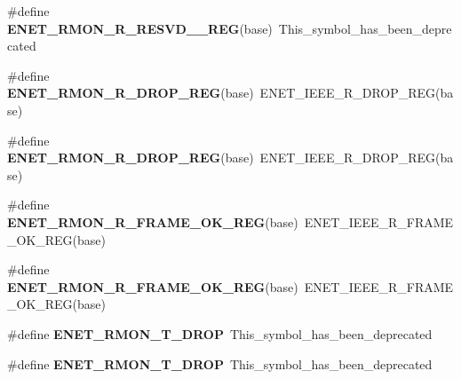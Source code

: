 \begin{DoxyCompactItemize}
\item 
\#define {\bfseries E\+N\+E\+T\+\_\+\+R\+M\+O\+N\+\_\+\+R\+\_\+\+R\+E\+S\+V\+D\+\_\+\_\+\+R\+EG}(base)~This\+\_\+symbol\+\_\+has\+\_\+been\+\_\+deprecated\hypertarget{group__Backward__Compatibility__Symbols_ga911420e8f14b5d4711e0cec193358811}{}\label{group__Backward__Compatibility__Symbols_ga911420e8f14b5d4711e0cec193358811}

\item 
\#define {\bfseries E\+N\+E\+T\+\_\+\+R\+M\+O\+N\+\_\+\+R\+\_\+\+D\+R\+O\+P\+\_\+\+R\+EG}(base)~E\+N\+E\+T\+\_\+\+I\+E\+E\+E\+\_\+\+R\+\_\+\+D\+R\+O\+P\+\_\+\+R\+EG(base)\hypertarget{group__Backward__Compatibility__Symbols_gaa42b3294937bb78ddcb71cbc54151c85}{}\label{group__Backward__Compatibility__Symbols_gaa42b3294937bb78ddcb71cbc54151c85}

\item 
\#define {\bfseries E\+N\+E\+T\+\_\+\+R\+M\+O\+N\+\_\+\+R\+\_\+\+D\+R\+O\+P\+\_\+\+R\+EG}(base)~E\+N\+E\+T\+\_\+\+I\+E\+E\+E\+\_\+\+R\+\_\+\+D\+R\+O\+P\+\_\+\+R\+EG(base)\hypertarget{group__Backward__Compatibility__Symbols_gaa42b3294937bb78ddcb71cbc54151c85}{}\label{group__Backward__Compatibility__Symbols_gaa42b3294937bb78ddcb71cbc54151c85}

\item 
\#define {\bfseries E\+N\+E\+T\+\_\+\+R\+M\+O\+N\+\_\+\+R\+\_\+\+F\+R\+A\+M\+E\+\_\+\+O\+K\+\_\+\+R\+EG}(base)~E\+N\+E\+T\+\_\+\+I\+E\+E\+E\+\_\+\+R\+\_\+\+F\+R\+A\+M\+E\+\_\+\+O\+K\+\_\+\+R\+EG(base)\hypertarget{group__Backward__Compatibility__Symbols_gaa157073b7098ee58966120129393c9ec}{}\label{group__Backward__Compatibility__Symbols_gaa157073b7098ee58966120129393c9ec}

\item 
\#define {\bfseries E\+N\+E\+T\+\_\+\+R\+M\+O\+N\+\_\+\+R\+\_\+\+F\+R\+A\+M\+E\+\_\+\+O\+K\+\_\+\+R\+EG}(base)~E\+N\+E\+T\+\_\+\+I\+E\+E\+E\+\_\+\+R\+\_\+\+F\+R\+A\+M\+E\+\_\+\+O\+K\+\_\+\+R\+EG(base)\hypertarget{group__Backward__Compatibility__Symbols_gaa157073b7098ee58966120129393c9ec}{}\label{group__Backward__Compatibility__Symbols_gaa157073b7098ee58966120129393c9ec}

\item 
\#define {\bfseries E\+N\+E\+T\+\_\+\+R\+M\+O\+N\+\_\+\+T\+\_\+\+D\+R\+OP}~This\+\_\+symbol\+\_\+has\+\_\+been\+\_\+deprecated\hypertarget{group__Backward__Compatibility__Symbols_gac5608b729470cc47103c854e2f880d9c}{}\label{group__Backward__Compatibility__Symbols_gac5608b729470cc47103c854e2f880d9c}

\item 
\#define {\bfseries E\+N\+E\+T\+\_\+\+R\+M\+O\+N\+\_\+\+T\+\_\+\+D\+R\+OP}~This\+\_\+symbol\+\_\+has\+\_\+been\+\_\+deprecated\hypertarget{group__Backward__Compatibility__Symbols_gac5608b729470cc47103c854e2f880d9c}{}\label{group__Backward__Compatibility__Symbols_gac5608b729470cc47103c854e2f880d9c}


\end{DoxyCompactItemize}
